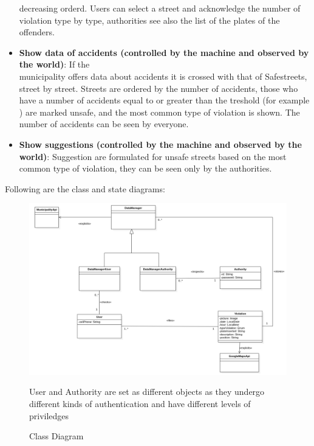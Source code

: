 \begin{itemize}
    decreasing orderd. Users can select a street and acknowledge the number of violation 
    type by type, authorities see also the list of the plates of the offenders.
    \item \textbf{Show data of accidents (controlled by the machine and observed by the world)}: 
    If the \\ municipality offers data about accidents it is crossed with that of Safestreets, 
    street by street. Streets are ordered by the number of accidents, those who have a 
    number of accidents equal to or greater than the treshold (for example 
    \textcolor{Red}{\tres}) are marked unsafe, and the most common type of violation is shown. 
    The number of accidents can be seen by everyone.
    \item \textbf{Show suggestions (controlled by the machine and observed by the world)}: 
    Suggestion are formulated for unsafe streets based on the most common type of violation, 
    they can be seen only by the authorities.
\end{itemize}

Following are the class and state diagrams: \newpage

\begin{figure}[H]
    \centering
    \includegraphics[width=\textwidth]{Images/Diagrams/uml.png}
    \caption{\label{fig:UML}Class Diagram}
    \medskip
    \small
    User and Authority are set as different objects as they undergo different kinds of 
    authentication and have different levels of priviledges
\end{figure}

